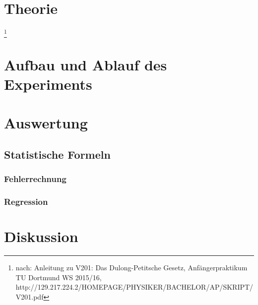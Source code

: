 \documentclass[a4,12pt]{article}
\begin{document}



\tableofcontents
\newpage


\section{Theorie}\footnote{nach: Anleitung zu V201: Das Dulong-Petitsche Gesetz, Anfängerpraktikum TU Dortmund WS 2015/16, http://129.217.224.2/HOMEPAGE/PHYSIKER/BACHELOR/AP/SKRIPT/V201.pdf}

\newpage


\section{Aufbau und Ablauf des Experiments}

\newpage


\section{Auswertung}
\subsection{Statistische Formeln}
\subsubsection{Fehlerrechnung}
\label{sec:Fehlerrechnung}

\subsubsection{Regression}
\label{sec:regression}


\newpage


\section{Diskussion}

\end{document}
